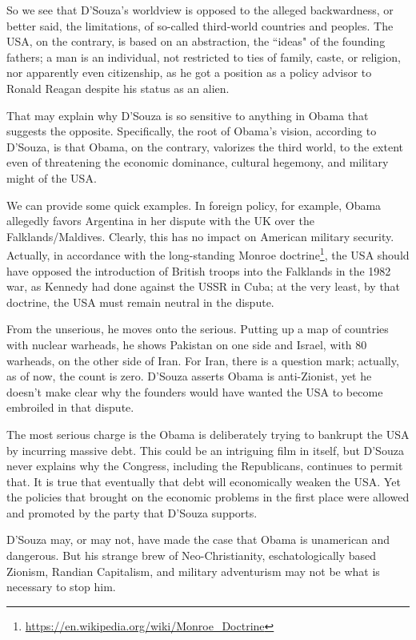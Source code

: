 So we see that D'Souza's worldview is opposed to the alleged backwardness, or better said, the limitations, of so-called third-world countries and peoples. The USA, on the contrary, is based on an abstraction, the ``ideas" of the founding fathers; a man is an individual, not restricted to ties of family, caste, or religion, nor apparently even citizenship, as he got a position as a policy advisor to Ronald Reagan despite his status as an alien.

That may explain why D'Souza is so sensitive to anything in Obama that suggests the opposite. Specifically, the root of Obama's vision, according to D'Souza, is that Obama, on the contrary, valorizes the third world, to the extent even of threatening the economic dominance, cultural hegemony, and military might of the USA.

We can provide some quick examples. In foreign policy, for example, Obama allegedly favors Argentina in her dispute with the UK over the Falklands/Maldives. Clearly, this has no impact on American military security. Actually, in accordance with the long-standing Monroe doctrine\footnote{\url{https://en.wikipedia.org/wiki/Monroe_Doctrine}}, the USA should have opposed the introduction of British troops into the Falklands in the 1982 war, as Kennedy had done against the USSR in Cuba; at the very least, by that doctrine, the USA must remain neutral in the dispute.

From the unserious, he moves onto the serious. Putting up a map of countries with nuclear warheads, he shows Pakistan on one side and Israel, with 80 warheads, on the other side of Iran. For Iran, there is a question mark; actually, as of now, the count is zero. D'Souza asserts Obama is anti-Zionist, yet he doesn't make clear why the founders would have wanted the USA to become embroiled in that dispute.

The most serious charge is the Obama is deliberately trying to bankrupt the USA by incurring massive debt. This could be an intriguing film in itself, but D'Souza never explains why the Congress, including the Republicans, continues to permit that. It is true that eventually that debt will economically weaken the USA. Yet the policies that brought on the economic problems in the first place were allowed and promoted by the party that D'Souza supports.

D'Souza may, or may not, have made the case that Obama is unamerican and dangerous. But his strange brew of Neo-Christianity, eschatologically based Zionism, Randian Capitalism, and military adventurism may not be what is necessary to stop him.



